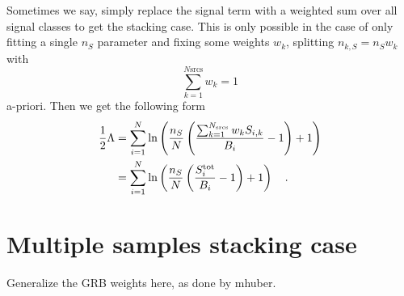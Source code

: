 Sometimes we say, simply replace the signal term with a weighted sum over all signal classes to get the stacking case.
This is only possible in the case of only fitting a single $n_S$ parameter and fixing some weights $w_k$, splitting $n_{k,S} = n_S w_k$ with
\begin{equation}
  \sum_{k=1}^{N\text{srcs}} w_k = 1
\end{equation}
a-priori.
Then we get the following form
\begin{align}
  \frac{1}{2}\Lambda
  &= \sum_{i=1}^N\ln\left(
      \frac{n_S}{N}\left(
        \frac{\sum_{k=1}^{N_\text{srcs}}w_k S_{i,k}}{B_i} - 1
      \right) + 1
    \right)  \\
  &= \sum_{i=1}^N\ln\left(
      \frac{n_S}{N}\left(\frac{S_i^\text{tot}}{B_i} - 1\right) + 1
    \right)
  \quad\text{.}
\end{align}

\section{Multiple samples stacking case}
Generalize the GRB weights here, as done by mhuber.
